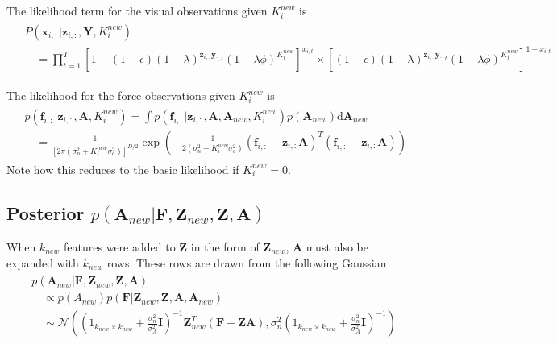 \documentclass[]{article}
\begin{document}
The likelihood term for the visual observations given $K^{new}_i$ is
	\begin{align}
		\begin{split}
			&P(\mathbf{x}_{i,:}| \mathbf{z}_{i,:}, \mathbf{Y}, K^{new}_i) \\
			&\quad=  \prod_{t=1}^{T} \left[1 - (1-\epsilon)(1-\lambda)^{\mathbf{z}_{i,:}\mathbf{y}_{:,t}}(1-\lambda\phi)^{K^{new}_i}\right]^{x_{i,t}} \times \left[ (1-\epsilon)(1-\lambda)^{\mathbf{z}_{i,:}\mathbf{y}_{:,t}}(1-\lambda\phi)^{K^{new}_i}\right]^{1 - x_{i,t}} 
		\end{split}
	\end{align}
	
The likelihood for the force observations given $K^{new}_i$ is
 	\begin{align}
 		\begin{split}
 			&p(\mathbf{f}_{i,:}|\mathbf{z}_{i,:}, \mathbf{A}, K^{new}_i) = \int p(\mathbf{f}_{i,:}|\mathbf{z}_{i,:}, \mathbf{A}, \mathbf{A}_{new}, K^{new}_i)p(\mathbf{A}_{new}) \text{d} \mathbf{A}_{new} \\
 			&\quad= \frac{1}{[2 \pi (\sigma^2_n + K^{new}_i\sigma^2_a)]^{D/2}}	\exp \left(-\frac{1}{2(\sigma^2_n + K^{new}_i\sigma^2_a)} (\mathbf{f}_{i,:} - \mathbf{z}_{i,:} \mathbf{A})^T (\mathbf{f}_{i,:} - \mathbf{z}_{i,:} \mathbf{A}) \right)
 		\end{split}
 	\end{align}
Note how this reduces to the basic likelihood if  $K^{new}_i = 0$.
	
\subsection{Posterior $p(\mathbf{A}_{new}| \mathbf{F}, \mathbf{Z}_{new}, \mathbf{Z}, \mathbf{A})$}
	When $k_{new}$ features were added to $\mathbf{Z}$ in the form of $\mathbf{Z}_{new}$, $\mathbf{A}$ must also be expanded with $k_{new}$ rows. These rows are drawn from the following Gaussian
	\begin{align}
		\begin{split}\label{eq:posterior_Anew}
			&p(\mathbf{A}_{new}| \mathbf{F}, \mathbf{Z}_{new}, \mathbf{Z}, \mathbf{A}) \\
			&\quad \propto p(A_{new}) p(\mathbf{F} | \mathbf{Z}_{new}, \mathbf{Z}, \mathbf{A}, \mathbf{A}_{new}) \\
			&\quad \sim \mathcal{N}\left( \left(1_{k_{new}\times k_{new}}  + \frac{\sigma^2_n}{\sigma^2_A}\mathbf{I}\right)^{-1} \mathbf{Z}^T_{new} (\mathbf{F} - \mathbf{Z} \mathbf{A}), \sigma^2_n \left(1_{k_{new}\times k_{new}}  + \frac{\sigma^2_n}{\sigma^2_A}\mathbf{I}\right)^{-1}  \right)
		\end{split}
	\end{align}
\end{document}
